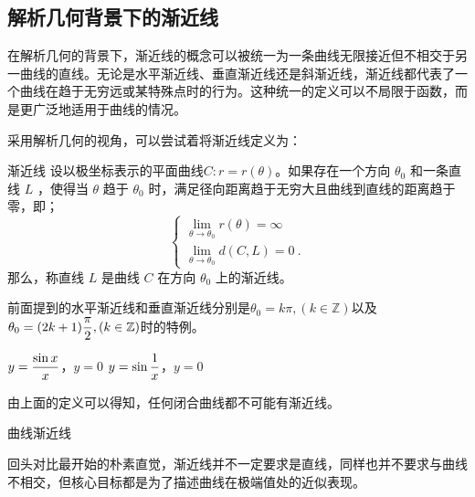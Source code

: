 \subsection{解析几何背景下的渐近线}

在解析几何的背景下，渐近线的概念可以被统一为一条曲线无限接近但不相交于另一曲线的直线。无论是水平渐近线、垂直渐近线还是斜渐近线，渐近线都代表了一个曲线在趋于无穷远或某特殊点时的行为。这种统一的定义可以不局限于函数，而是更广泛地适用于曲线的情况。

采用解析几何的视角，可以尝试着将渐近线定义为：

\begin{definition}{渐近线}
设以极坐标表示的平面曲线$C:r=r(\theta)$。如果存在一个方向  $\theta_0$  和一条直线  $L$ ，使得当  $\theta$  趋于  $\theta_0$  时，满足径向距离趋于无穷大且曲线到直线的距离趋于零，即；
\begin{equation}
\begin{cases}
\displaystyle\lim_{\theta \to \theta_0} r(\theta) = \infty\\
\displaystyle\lim_{\theta \to \theta_0} d(C, L) = 0~.
\end{cases}
\end{equation}
那么，称直线  $L$  是曲线  $C$  在方向  $\theta_0$  上的渐近线。
\end{definition}

前面提到的水平渐近线和垂直渐近线分别是$\theta_0=k\pi,(k\in\mathbb{Z})$以及$\displaystyle\theta_0=(2k+1){\pi\over2},(k\in\mathbb{Z})$时的特例。

$\displaystyle y={\sin x\over x}$，$y=0$
$\displaystyle y=\sin {1\over x}$，$y=0$

由上面的定义可以得知，任何闭合曲线都不可能有渐近线。

曲线渐近线

回头对比最开始的朴素直觉，渐近线并不一定要求是直线，同样也并不要求与曲线不相交，但核心目标都是为了描述曲线在极端值处的近似表现。